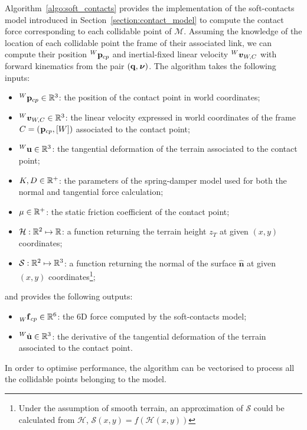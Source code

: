 Algorithm~\ref{algo:soft_contacts} provides the implementation of the soft-contacts model introduced in Section~\ref{section:contact_model} to compute the contact force corresponding to each collidable point of $\mathcal{M}$.
Assuming the knowledge of the location of each collidable point \wrt the frame of their associated link, we can compute their position $\pos[W]_{cp}$ and inertial-fixed linear velocity $\vellin[W]_{W,C}$ with forward kinematics from the pair $(\Qu, \Nu)$.
The algorithm takes the following inputs:
%
\begin{itemize}
    \item $\pos[W]_{cp} \in \realn^3$: the position of the contact point in world coordinates;
    \item $\vellin[W]_{W,C} \in \realn^3$: the linear velocity expressed in world coordinates of the frame $C = (\pos_{cp}, [W])$ associated to the contact point;
    \item ${}^W \mathbf{u} \in \realn^3$: the tangential deformation of the terrain associated to the contact point;
    \item $K, D \in \realn^+$: the parameters of the spring-damper model used for both the normal and tangential force calculation;
    \item $\mu \in \realn^+$: the static friction coefficient of the contact point;
    \item $\mathcal{H}: \realn^2 \mapsto \realn$: a function returning the terrain height $z_T$ at given $(x, y)$ coordinates;
    \item $\mathcal{S}: \realn^2 \mapsto \realn^3$: a function returning the normal of the surface $\hat{\mathbf{n}}$ at given $(x, y)$ coordinates\footnote{Under the assumption of smooth terrain, an approximation of $\mathcal{S}$ could be calculated from $\mathcal{H}$, \ie $\mathcal{S}(x, y) = f\left(\mathcal{H}(x, y)\right)$};
\end{itemize}
%
and provides the following outputs:
%
\begin{itemize}
    \item $\forcesix[W]_{cp} \in \realn^6$: the 6D force computed by the soft-contacts model;
    \item ${}^W \dot{\mathbf{u}} \in \realn^3$: the derivative of the tangential deformation of the terrain associated to the contact point.
\end{itemize}
%
In order to optimise performance, the algorithm can be vectorised to process all the collidable points belonging to the model.

